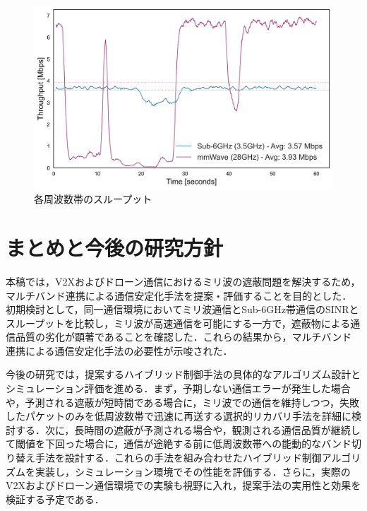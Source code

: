 \documentclass[10pt, twocolumn, a4j, platex]{jsarticle}	%
\begin{document}
\begin{figure}[tb]
	\centering
	\includegraphics[width=0.95\linewidth]{./images/harq_comprehensive_analysis.png}
	\caption{各周波数帯のスループット} \label{fig:throughput}
\end{figure}

\section{まとめと今後の研究方針}

本稿では，V2Xおよびドローン通信におけるミリ波の遮蔽問題を解決するため，マルチバンド連携による通信安定化手法を提案・評価することを目的とした．初期検討として，同一通信環境においてミリ波通信とSub-6GHz帯通信のSINRとスループットを比較し，ミリ波が高速通信を可能にする一方で，遮蔽物による通信品質の劣化が顕著であることを確認した．これらの結果から，マルチバンド連携による通信安定化手法の必要性が示唆された．

今後の研究では，提案するハイブリッド制御手法の具体的なアルゴリズム設計とシミュレーション評価を進める．まず，予期しない通信エラーが発生した場合や，予測される遮蔽が短時間である場合に，ミリ波での通信を維持しつつ，失敗したパケットのみを低周波数帯で迅速に再送する選択的リカバリ手法を詳細に検討する．次に，長時間の遮蔽が予測される場合や，観測される通信品質が継続して閾値を下回った場合に，通信が途絶する前に低周波数帯への能動的なバンド切り替え手法を設計する．これらの手法を組み合わせたハイブリッド制御アルゴリズムを実装し，シミュレーション環境でその性能を評価する．さらに，実際のV2Xおよびドローン通信環境での実験も視野に入れ，提案手法の実用性と効果を検証する予定である．


\end{document}
